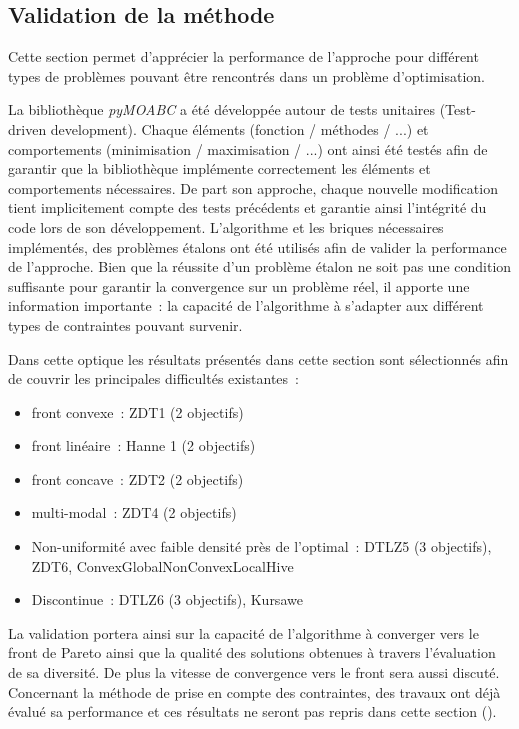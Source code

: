\subsection{Validation de la méthode} %
\label{sub:validation_de_la_methode}


Cette section permet d’apprécier la performance de l’approche pour différent types
de problèmes pouvant être rencontrés dans un problème d’optimisation.

La bibliothèque \textit{pyMOABC} a été développée autour de tests unitaires
(Test-driven development).
Chaque éléments (fonction / méthodes / ...) et comportements (minimisation / maximisation / ...)
ont ainsi été testés afin de garantir que la bibliothèque implémente correctement
les éléments et comportements nécessaires. De part son approche, chaque nouvelle
modification tient implicitement compte des tests précédents et garantie ainsi
l’intégrité du code lors de son développement.
L’algorithme et les briques nécessaires implémentés, des problèmes étalons ont été
utilisés afin de valider la performance de l’approche. Bien que la réussite d’un
problème étalon ne soit pas une condition suffisante pour garantir la convergence
sur un problème réel, il apporte une information importante~: la capacité de
l’algorithme à s’adapter aux différent types de contraintes pouvant survenir.

Dans cette optique les résultats présentés dans cette section sont sélectionnés
afin de couvrir les principales difficultés existantes~:
\begin{itemize}
  \item front convexe~: ZDT1 (2 objectifs)
  \item front linéaire~: Hanne 1 (2 objectifs)
  \item front concave~: ZDT2 (2 objectifs)
  \item multi-modal~: ZDT4 (2 objectifs)
  \item Non-uniformité avec faible densité près de l’optimal~: DTLZ5 (3 objectifs), ZDT6, ConvexGlobalNonConvexLocalHive
  \item Discontinue~: DTLZ6 (3 objectifs), Kursawe
\end{itemize}
La validation portera ainsi sur la capacité de l’algorithme à converger vers le
front de Pareto ainsi que la qualité des solutions obtenues à travers l’évaluation
de sa diversité. De plus la vitesse de convergence vers le front sera aussi discuté.
Concernant la méthode de prise en compte des contraintes, des travaux ont déjà
évalué sa performance et ces résultats ne seront pas repris dans cette section ().

